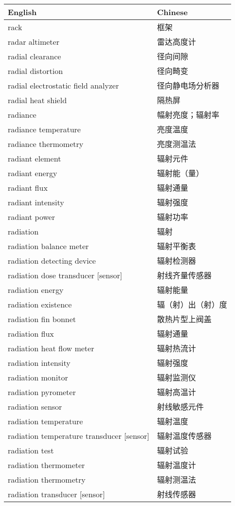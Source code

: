 \documentclass[
]{article}
\begin{document}
\begin{longtable}[]{@{}ll@{}}
\toprule()
English & Chinese \\
\midrule()
\endhead
rack & 框架 \\
radar altimeter & 雷达高度计 \\
radial clearance & 径向间隙 \\
radial distortion & 径向畸变 \\
radial electrostatic field analyzer & 径向静电场分析器 \\
radial heat shield & 隔热屏 \\
radiance & 幅射亮度；辐射率 \\
radiance temperature & 亮度温度 \\
radiance thermometry & 亮度测温法 \\
radiant element & 辐射元件 \\
radiant energy & 辐射能（量） \\
radiant flux & 辐射通量 \\
radiant intensity & 辐射强度 \\
radiant power & 辐射功率 \\
radiation & 辐射 \\
radiation balance meter & 辐射平衡表 \\
radiation detecting device & 辐射检测器 \\
radiation dose transducer {[}sensor{]} & 射线齐量传感器 \\
radiation energy & 辐射能量 \\
radiation existence & 辐（射）出（射）度 \\
radiation fin bonnet & 散热片型上阀盖 \\
radiation flux & 辐射通量 \\
radiation heat flow meter & 辐射热流计 \\
radiation intensity & 辐射强度 \\
radiation monitor & 辐射监测仪 \\
radiation pyrometer & 辐射高温计 \\
radiation sensor & 射线敏感元件 \\
radiation temperature & 辐射温度 \\
radiation temperature transducer {[}sensor{]} & 辐射温度传感器 \\
radiation test & 辐射试验 \\
radiation thermometer & 辐射温度计 \\
radiation thermometry & 辐射测温法 \\
radiation transducer {[}sensor{]} & 射线传感器 \\

\end{longtable}
\end{document}
